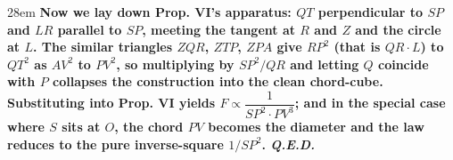 \documentclass[border=4pt]{standalone}
\begin{document}
\begin{varwidth}{28em}
\large\bfseries
Now we lay down Prop. VI's apparatus: $QT$ perpendicular to $SP$ and $LR$ parallel to $SP$,      meeting the tangent at $R$ and $Z$ and the circle at $L$.      The similar triangles $ZQR$, $ZTP$, $ZPA$ give $RP^2$ (that is $QR\cdot L$) to $QT^2$ as $AV^2$ to $PV^2$,      so multiplying by $SP^2/QR$ and letting $Q$ coincide with $P$ collapses the construction into the clean chord-cube.      Substituting into Prop. VI yields $F \propto \dfrac{1}{SP^2\cdot PV^3}$; and in the special case where $S$ sits at $O$,      the chord $PV$ becomes the diameter and the law reduces to the pure inverse-square $1/SP^2$. \textit{Q.E.D.}
\end{varwidth}
\end{document}
